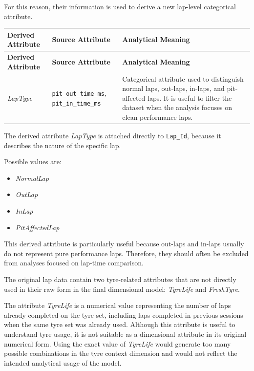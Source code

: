 \documentclass[a4paper,11pt]{article}
\begin{document}
	For this reason, their information is used to derive a new lap-level categorical attribute.
	
	\begin{longtable}{|p{4.2cm}|p{4.2cm}|p{6.2cm}|}
		\hline
		\textbf{Derived Attribute} & \textbf{Source Attribute} & \textbf{Analytical Meaning} \\
		\hline
		\endfirsthead
		
		\hline
		\textbf{Derived Attribute} & \textbf{Source Attribute} & \textbf{Analytical Meaning} \\
		\hline
		\endhead
		
		\textit{LapType}
		& \texttt{pit\_out\_time\_ms}, \texttt{pit\_in\_time\_ms}
		& Categorical attribute used to distinguish normal laps, out-laps, in-laps, and pit-affected laps. It is useful to filter the dataset when the analysis focuses on clean performance laps. \\
		\hline
	\end{longtable}
	
	The derived attribute \textit{LapType} is attached directly to \texttt{Lap\_Id}, because it
	describes the nature of the specific lap.
	
	Possible values are:
	
	\begin{itemize}
		\item \textit{NormalLap}
		\item \textit{OutLap}
		\item \textit{InLap}
		\item \textit{PitAffectedLap}
	\end{itemize}
	
	This derived attribute is particularly useful because out-laps and in-laps usually do not
	represent pure performance laps. Therefore, they should often be excluded from analyses
	focused on lap-time comparison.
	
	

	
	The original lap data contain two tyre-related attributes that are not directly used in
	their raw form in the final dimensional model: \textit{TyreLife} and \textit{FreshTyre}.
	
	The attribute \textit{TyreLife} is a numerical value representing the number of laps
	already completed on the tyre set, including laps completed in previous sessions when
	the same tyre set was already used. Although this attribute is useful to understand tyre
	usage, it is not suitable as a dimensional attribute in its original numerical form. Using
	the exact value of \textit{TyreLife} would generate too many possible combinations in the
	tyre context dimension and would not reflect the intended analytical usage of the model.
	
\end{document}
